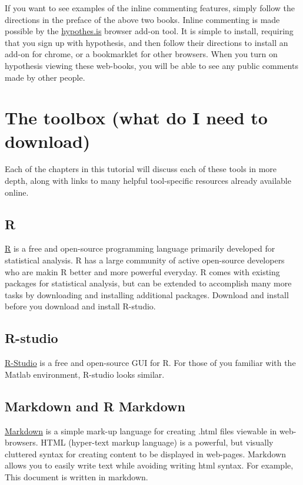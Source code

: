 \documentclass[]{book}
\theoremstyle{definition}
\theoremstyle{definition}
\theoremstyle{definition}
\theoremstyle{remark}
\begin{document}
If you want to see examples of the inline commenting features, simply
follow the directions in the preface of the above two books. Inline
commenting is made possible by the
\href{https://web.hypothes.is}{hypothes.is} browser add-on tool. It is
simple to install, requiring that you sign up with hypothesis, and then
follow their directions to install an add-on for chrome, or a
bookmarklet for other browsers. When you turn on hypothesis viewing
these web-books, you will be able to see any public comments made by
other people.

\section{The toolbox (what do I need to
download)}\label{the-toolbox-what-do-i-need-to-download}

Each of the chapters in this tutorial will discuss each of these tools
in more depth, along with links to many helpful tool-specific resources
already available online.

\subsection{R}\label{r}

\href{https://www.r-project.org}{R} is a free and open-source
programming language primarily developed for statistical analysis. R has
a large community of active open-source developers who are makin R
better and more powerful everyday. R comes with existing packages for
statistical analysis, but can be extended to accomplish many more tasks
by downloading and installing additional packages. Download and install
before you download and install R-studio.

\subsection{R-studio}\label{r-studio}

\href{https://www.rstudio.com}{R-Studio} is a free and open-source GUI
for R. For those of you familiar with the Matlab environment, R-studio
looks similar.

\subsection{Markdown and R Markdown}\label{markdown-and-r-markdown}

\href{https://github.com/adam-p/markdown-here/wiki/Markdown-Cheatsheet}{Markdown}
is a simple mark-up language for creating .html files viewable in
web-browsers. HTML (hyper-text markup language) is a powerful, but
visually cluttered syntax for creating content to be displayed in
web-pages. Markdown allows you to easily write text while avoiding
writing html syntax. For example, This document is written in markdown.
\end{document}
